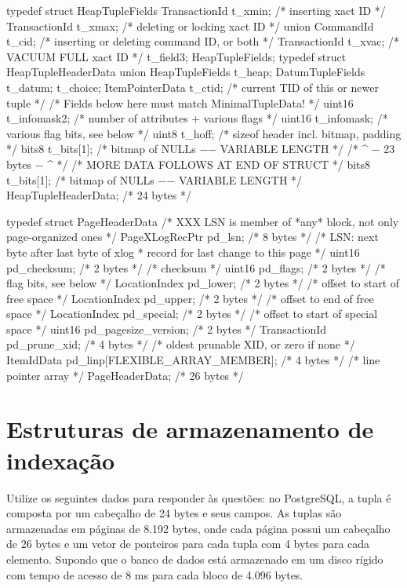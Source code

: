 \def\exercise{\bigskip\noindent\addtocounter{exno}{1}Exercício~\arabic{exno}.~}


typedef struct HeapTupleFields
{
  TransactionId t_xmin; /* inserting xact ID */
  TransactionId t_xmax; /* deleting or locking xact ID */
  union
  {
    CommandId t_cid; /* inserting or deleting command ID, or both */
    TransactionId t_xvac; /* VACUUM FULL xact ID */
  } t_field3;
} HeapTupleFields;
typedef struct HeapTupleHeaderData
{
  union
  {
    HeapTupleFields t_heap;
    DatumTupleFields t_datum;
  } t_choice;
  ItemPointerData t_ctid; /* current TID of this or newer tuple */
  /* Fields below here must match MinimalTupleData! */
  uint16 t_infomask2; /* number of attributes + various flags */
  uint16 t_infomask; /* various flag bits, see below */
  uint8 t_hoff; /* sizeof header incl. bitmap, padding */
  bits8 t_bits[1]; /* bitmap of NULLs −− VARIABLE LENGTH */
  /* ^ − 23 bytes − ^ */
  /* MORE DATA FOLLOWS AT END OF STRUCT */
  bits8 t_bits[1]; /* bitmap of NULLs −− VARIABLE LENGTH */
} HeapTupleHeaderData; /* 24 bytes */


typedef struct PageHeaderData
{
  /* XXX LSN is member of *any* block, not only page-organized ones */
  PageXLogRecPtr pd_lsn;  /* 8 bytes */        /* LSN: next byte after last byte of xlog
  * record for last change to this page */
  uint16          pd_checksum; /* 2 bytes */   /* checksum */
  uint16          pd_flags;   /* 2 bytes */            /* flag bits, see below */
  LocationIndex pd_lower;   /* 2 bytes */      /* offset to start of free space */
  LocationIndex pd_upper;    /* 2 bytes */     /* offset to end of free space */
  LocationIndex pd_special;   /* 2 bytes */    /* offset to start of special space */
  uint16          pd_pagesize_version; /* 2 bytes */
  TransactionId pd_prune_xid; /* 4 bytes */ /* oldest prunable XID, or zero if none */
  ItemIdData      pd_linp[FLEXIBLE_ARRAY_MEMBER]; /* 4 bytes */ /* line pointer array */
} PageHeaderData; /* 26 bytes */


\section*{Estruturas de armazenamento de indexação}

Utilize os seguintes dados para responder às questões: no PostgreSQL,
a tupla é composta por um cabeçalho de 24 bytes e seus campos.  As
tuplas são armazenadas em páginas de 8.192 bytes, onde cada página
possui um cabeçalho de 26 bytes e um vetor de ponteiros para cada
tupla com 4 bytes para cada elemento. Supondo que o banco de dados
está armazenado em um disco rígido com tempo de acesso de 8 ms para
cada bloco de 4.096 bytes.\bigskip

